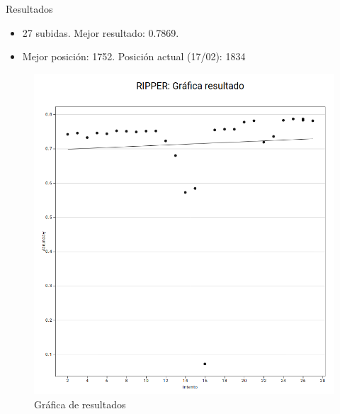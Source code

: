 \begin{frame}{Resultados}
\begin{itemize}
	\item 27 subidas. Mejor resultado: 0.7869.
	\item Mejor posición: 1752. Posición actual (17/02): 1834
\end{itemize}
	\begin{figure}
		\centering
		\includegraphics[scale=0.2]{figures/res-ripper.png}
		\caption{Gráfica de resultados}
	\end{figure}
\end{frame}

